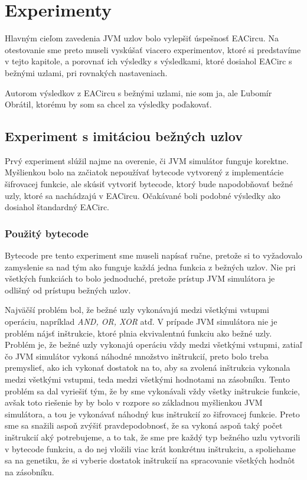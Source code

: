 \chapter{Experimenty}
\label{chap:experiments}

Hlavným cieľom zavedenia JVM uzlov bolo vylepšiť úspešnosť EACircu. Na otestovanie sme preto museli vyskúšať viacero experimentov, ktoré si predstavíme v tejto kapitole, a porovnať ich výsledky s výsledkami, ktoré dosiahol EACirc s bežnými uzlami, pri rovnakých nastaveniach. 

Autorom výsledkov z EACircu s bežnými uzlami, nie som ja, ale Ľubomír Obrátil, ktorému by som sa chcel za výsledky poďakovať.

\section{Experiment s imitáciou bežných uzlov}
\label{sec:exp1}

Prvý experiment slúžil najme na overenie, či JVM simulátor funguje korektne. Myšlienkou bolo na začiatok nepoužívať bytecode vytvorený z implementácie šifrovacej funkcie, ale skúsiť vytvoriť bytecode, ktorý bude napodobňovať bežné uzly, ktoré sa nachádzajú v EACircu. Očakávané boli podobné výsledky ako dosiahol štandardný EACirc.

\subsection{Použitý bytecode}
\label{subsec:exp1-bytecode}

Bytecode pre tento experiment sme museli napísať ručne, pretože si to vyžadovalo zamyslenie sa nad tým ako funguje každá jedna funkcia z bežných uzlov. Nie pri všetkých funkciách to bolo jednoduché, pretože prístup JVM simulátora je odlišný od prístupu bežných uzlov. 

Najväčší problém bol, že bežné uzly vykonávajú medzi všetkými vstupmi operáciu, napríklad \textit{AND, OR, XOR} atď. V prípade JVM simulátora nie je problém nájsť inštrukcie, ktoré plnia ekvivalentnú funkciu ako bežné uzly. Problém je, že bežné uzly vykonajú operáciu vždy medzi všetkými vstupmi, zatiaľ čo JVM simulátor vykoná náhodné množstvo inštrukcií, preto bolo treba premyslieť, ako ich vykonať dostatok na to, aby sa zvolená inštrukcia vykonala medzi všetkými vstupmi, teda medzi všetkými hodnotami na zásobníku. Tento problém sa dal vyriešiť tým, že by sme vykonávali vždy všetky inštrukcie funkcie, avšak toto riešenie by by bolo v rozpore so základnou myšlienkou JVM simulátora, a tou je vykonávať náhodný kus inštrukcií zo šifrovacej funkcie. Preto sme sa snažili aspoň zvýšiť pravdepodobnosť, že sa vykoná aspoň taký počet inštrukcií aký potrebujeme, a to tak, že sme pre každý typ bežného uzlu vytvorili v bytecode funkciu, a do nej vložili viac krát konkrétnu inštrukciu, a spoliehame sa na genetiku, že si vyberie dostatok inštrukcií na spracovanie všetkých hodnôt na zásobníku.

